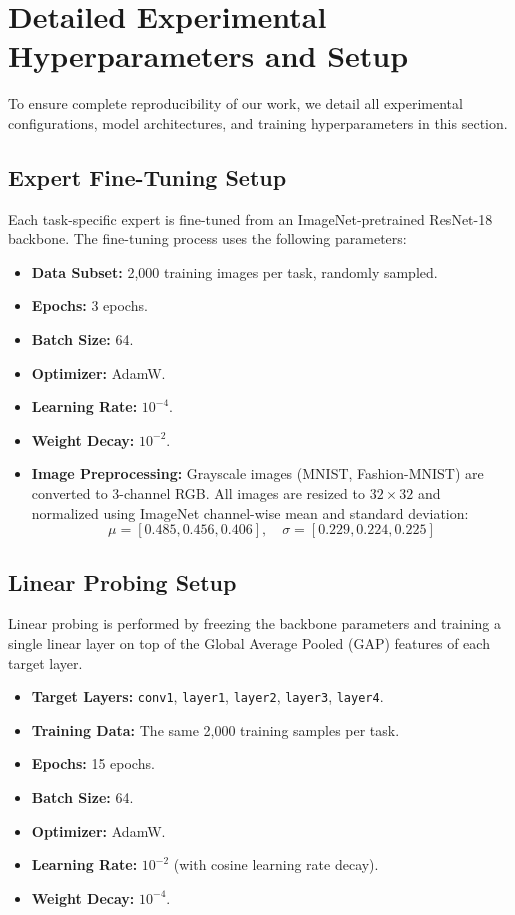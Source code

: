 \documentclass{article}
\theoremstyle{plain}
\theoremstyle{definition}
\theoremstyle{remark}
\begin{document}
\clearpage
\nocite{*}



\clearpage
\appendix
\onecolumn
\section{Detailed Experimental Hyperparameters and Setup}
\label{app:hyperparameters}

To ensure complete reproducibility of our work, we detail all experimental configurations, model architectures, and training hyperparameters in this section.

\subsection{Expert Fine-Tuning Setup}
Each task-specific expert is fine-tuned from an ImageNet-pretrained ResNet-18 backbone. The fine-tuning process uses the following parameters:
\begin{itemize}
  \item \textbf{Data Subset:} 2,000 training images per task, randomly sampled.
  \item \textbf{Epochs:} 3 epochs.
  \item \textbf{Batch Size:} 64.
  \item \textbf{Optimizer:} AdamW.
  \item \textbf{Learning Rate:} $10^{-4}$.
  \item \textbf{Weight Decay:} $10^{-2}$.
  \item \textbf{Image Preprocessing:} Grayscale images (MNIST, Fashion-MNIST) are converted to 3-channel RGB. All images are resized to $32 \times 32$ and normalized using ImageNet channel-wise mean and standard deviation:
  \begin{equation}
    \mu = [0.485, 0.456, 0.406], \quad \sigma = [0.229, 0.224, 0.225]
  \end{equation}
\end{itemize}

\subsection{Linear Probing Setup}
Linear probing is performed by freezing the backbone parameters and training a single linear layer on top of the Global Average Pooled (GAP) features of each target layer.
\begin{itemize}
  \item \textbf{Target Layers:} \texttt{conv1}, \texttt{layer1}, \texttt{layer2}, \texttt{layer3}, \texttt{layer4}.
  \item \textbf{Training Data:} The same 2,000 training samples per task.
  \item \textbf{Epochs:} 15 epochs.
  \item \textbf{Batch Size:} 64.
  \item \textbf{Optimizer:} AdamW.
  \item \textbf{Learning Rate:} $10^{-2}$ (with cosine learning rate decay).
  \item \textbf{Weight Decay:} $10^{-4}$.
\end{itemize}
\end{document}
